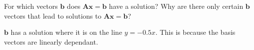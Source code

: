 For which vectors $\boldsymbol{b}$ does $\boldsymbol{Ax} = \boldsymbol{b}$ have a solution? Why are there only certain $\boldsymbol{b}$ vectors that lead to solutions to $\boldsymbol{Ax} = \boldsymbol{b}$?

\begin{solution}
    $\boldsymbol{b}$ has a solution where it is on the line $y=-0.5x$. This is because the basis vectors are linearly dependant.
\end{solution}